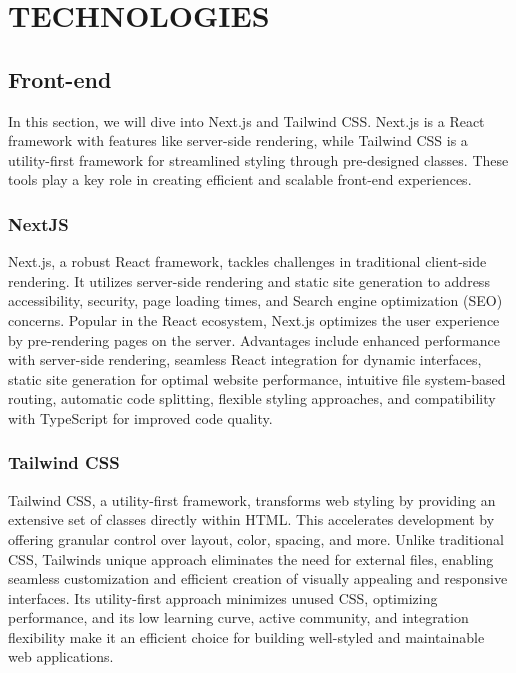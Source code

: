 \chapter{TECHNOLOGIES}

\section{Front-end}


In this section, we will dive into Next.js and Tailwind CSS. Next.js is
a React framework with features like server-side rendering, while
Tailwind CSS is a utility-first framework for streamlined styling
through pre-designed classes. These tools play a key role in creating
efficient and scalable front-end experiences.


\subsection{NextJS}

Next.js, a robust React framework, tackles challenges in traditional
client-side rendering. It utilizes server-side rendering and static site
generation to address accessibility, security, page loading times, and
Search engine optimization (SEO) concerns. Popular in the React
ecosystem, Next.js optimizes the user experience by pre-rendering pages
on the server. Advantages include enhanced performance with server-side
rendering, seamless React integration for dynamic interfaces, static
site generation for optimal website performance, intuitive file
system-based routing, automatic code splitting, flexible styling
approaches, and compatibility with TypeScript for improved code quality.


\subsection{Tailwind CSS}

Tailwind CSS, a utility-first framework, transforms web styling by
providing an extensive set of classes directly within HTML. This
accelerates development by offering granular control over layout, color,
spacing, and more. Unlike traditional CSS, Tailwind\textquotesingle s
unique approach eliminates the need for external files, enabling
seamless customization and efficient creation of visually appealing and
responsive interfaces. Its utility-first approach minimizes unused CSS,
optimizing performance, and its low learning curve, active community,
and integration flexibility make it an efficient choice for building
well-styled and maintainable web applications.


